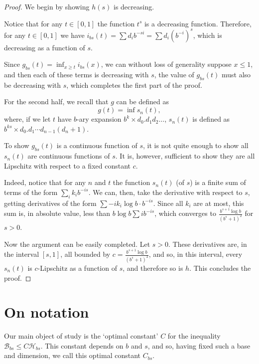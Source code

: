 \documentclass[11pt, reqno]{amsart}
\newcommand{\HH}{\mathcal{H}}
\newcommand{\BB}{\mathcal{B}}
\begin{document}
\begin{proof}
We begin by showing $h(s)$ is decreasing.

Notice that for any $t \in \left[0, 1 \right]$ the function $t^s$ is a decreasing function. Therefore, for any $t \in \left[0, 1\right]$ we have $i_{bs}(t) = \sum d_i b^{-si} = \sum d_i (b^{-i})^s$, which is decreasing as a function of $s$.

Since $g_{bs}(t) = \inf_{x \geq t} i_{bs}(x)$, we can without loss of generality suppose $x \leq 1$, and then each of these terms is decreasing with $s$, the value of $g_{bs}(t)$ must also be decreasing with $s$, which completes the first part of the proof.

For the second half, we recall that $g$ can be defined as
\[g(t) = \inf s_n(t),\]
where, if we let $t$ have $b$-ary expansion $b^k \times d_0 . d_1 d_2 \dots$, $s_n(t)$ is defined as $b^{ks} \times d_0 . d_1 \cdots d_{n-1} (d_n + 1)$.

To show $g_{bs}(t)$ is a continuous function of $s$, it is not quite enough to show all $s_n(t)$ are continuous functions of $s$. It is, however, sufficient to show they are all Lipschitz with respect to a fixed constant $c$.

Indeed, notice that for any $n$ and $t$ the function $s_n(t)$ (of $s$) is a finite sum of terms of the form $\sum_i k_i b^{-is}$.  We can, then, take the derivative with respect to $s$, getting derivatives of the form $\sum - i k_i \log b \cdot b^{-is}$. Since all $k_i$ are at most, this sum is, in absolute value, less than $b \log b \sum i b^{-is}$, which converges to $\frac{b^{s+1} \log b}{(b^s + 1)^2}$ for $s > 0$.

Now the argument can be easily completed. Let $s > 0$. These derivatives are, in the interval $\left[s, 1 \right]$, all bounded by $c = \frac{b^{s+1} \log b}{(b^s + 1)^2}$, and so, in this interval, every $s_n(t)$ is $c$-Lipschitz as a function of $s$, and therefore so is $h$. This concludes the proof.
\end{proof}

\section{On notation}

Our main object of study is the `optimal constant' $C$ for the inequality $\BB_{bs} \leq C \HH_{bs}$. This constant depends on $b$ and $s$, and so, having fixed such a base and dimension, we call this optimal constant $C_{bs}$.
\end{document}

